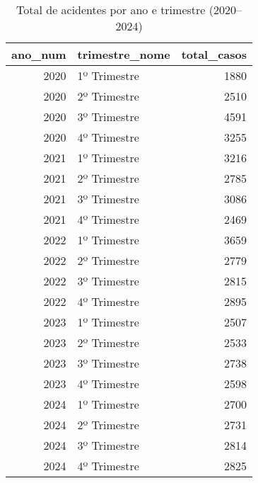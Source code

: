\begin{table}
\caption{Total de acidentes por ano e trimestre (2020–2024)}
\begin{tabular}{rlr}
\toprule
ano_num & trimestre_nome & total_casos \\
\midrule
2020 & 1º Trimestre & 1880 \\
2020 & 2º Trimestre & 2510 \\
2020 & 3º Trimestre & 4591 \\
2020 & 4º Trimestre & 3255 \\
2021 & 1º Trimestre & 3216 \\
2021 & 2º Trimestre & 2785 \\
2021 & 3º Trimestre & 3086 \\
2021 & 4º Trimestre & 2469 \\
2022 & 1º Trimestre & 3659 \\
2022 & 2º Trimestre & 2779 \\
2022 & 3º Trimestre & 2815 \\
2022 & 4º Trimestre & 2895 \\
2023 & 1º Trimestre & 2507 \\
2023 & 2º Trimestre & 2533 \\
2023 & 3º Trimestre & 2738 \\
2023 & 4º Trimestre & 2598 \\
2024 & 1º Trimestre & 2700 \\
2024 & 2º Trimestre & 2731 \\
2024 & 3º Trimestre & 2814 \\
2024 & 4º Trimestre & 2825 \\
\bottomrule
\end{tabular}
\end{table}
